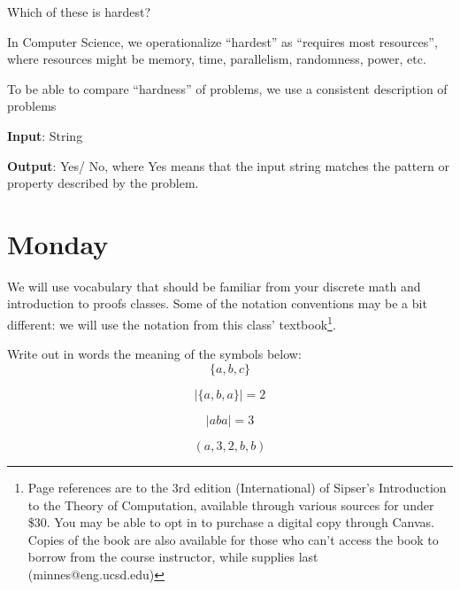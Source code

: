 \documentclass[12pt, oneside]{article}
\begin{document}
Which of these is hardest?

\vfill

In Computer Science, we operationalize ``hardest'' as ``requires most resources'', where
resources might be memory, time, parallelism, randomness, power, etc.

To be able to compare ``hardness'' of problems, we use a consistent description of problems

{\bf Input}: String

{\bf Output}: Yes/ No, where Yes means that the input string matches the pattern or property described by the problem.


\newpage
\section*{Monday}



We will use vocabulary that should be familiar from your discrete 
math and introduction to proofs classes.  Some of the notation conventions may 
be a bit different: we will use the notation from this class' textbook\footnote{Page references are to 
the 3rd edition (International) of Sipser's Introduction to the Theory of Computation,
available through various sources for under \$30. You may be able to 
opt in to purchase a digital copy through Canvas. Copies of the book are also available 
for those who can't access the book
to borrow from the course instructor, while supplies last (minnes@eng.ucsd.edu)}.

Write out in words the meaning of the symbols below: 
\[
    \{ a,b, c\}
\]

\phantom{The set whose elements are $a$, $b$, and $c$}

\[
    | \{a, b, a \} | = 2
\]


\[
    | aba | = 3
\]

\phantom{The length of the string $aba$ is $3$.}

\[
    (a, 3, 2, b, b)
\]

\phantom{The $5$-tuple whose first components is $a$, second component 
is $3$, third component is $2$, fourth component is $b$, and fifth component is $b$.}
\end{document}
